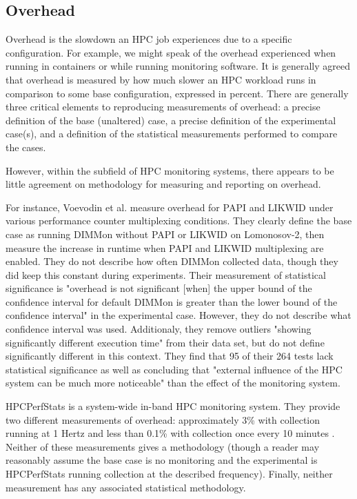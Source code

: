 \documentclass[conference]{IEEEtran}
\begin{document}
\subsection{Overhead}

Overhead is the slowdown an HPC job experiences due to a specific configuration. 
For example, we might speak of the overhead experienced when running in 
containers\cite{rezendeallesAssessingComputationCommunication2018} or while 
running monitoring software\cite{boehmeCaliperPerformanceIntrospection2016}. 
It is generally agreed that overhead is measured by how much slower an HPC 
workload runs in comparison to some base configuration, expressed in percent.
There are generally three critical elements to reproducing 
measurements of overhead: a precise definition of the base (unaltered) case, a 
precise definition of the experimental case(s), and a definition of the 
statistical measurements performed to compare the cases.

However, within the subfield of HPC monitoring systems, there appears to be 
little agreement on methodology for measuring and reporting on overhead.

For instance, Voevodin et al.\cite{voevodinOverheadAnalysisPerformance2022} 
measure overhead for PAPI and LIKWID under various performance counter 
multiplexing conditions. They clearly define the base case as running DIMMon 
without 
PAPI or LIKWID on Lomonosov-2, then measure the increase in runtime when PAPI 
and LIKWID multiplexing are enabled. They do not describe how often DIMMon 
collected data, though they did keep this constant during experiments. Their 
measurement of statistical significance is "overhead is not significant [when] 
the upper bound of the confidence interval for default DIMMon is greater than 
the lower bound of the confidence interval" in the experimental case. However, 
they do not describe what confidence interval was used. Additionaly, they 
remove outliers "showing significantly different execution time" from their 
data set, but do not define significantly different in this context.
They find that 95 of their 264 tests lack statistical significance as well as 
concluding that "external influence of the HPC system can be much more 
noticeable" than the effect of the monitoring system.

HPCPerfStats\cite{TACCHPCPerfStats2026} is a system-wide in-band HPC monitoring 
system. They provide two different measurements of overhead: approximately 3\% 
with collection running at 1 Hertz\cite{TACCHPCPerfStats2026} and less than 
0.1\% with collection once every 10 minutes
\cite{evansComprehensiveResourceUse2014}.
Neither of these measurements gives a methodology (though a reader may 
reasonably assume the base case is no monitoring and the experimental is 
HPCPerfStats running collection at the described frequency).
Finally, neither measurement has any associated statistical methodology.
\end{document}
